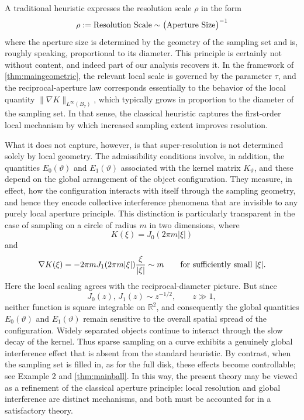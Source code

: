 \documentclass[11pt]{article}
\theoremstyle{definition}
\numberwithin{theorem}{section}
\numberwithin{lemma}{section}
\numberwithin{equation}{section}
\def\R{\mathbb{R}}
\numberwithin{equation}{section}
\begin{document}
A traditional heuristic expresses the resolution scale $\rho$ in the form
\begin{equation}
\label{eq:folklore}
\rho := \hbox{Resolution Scale} \sim \big(\hbox{Aperture Size}\big)^{-1}
\end{equation}
where the aperture size is determined by the geometry of the sampling set and is, roughly speaking, proportional to its diameter. 
This principle is certainly not without content, and indeed part of our analysis recovers it. In the framework of \cref{thm:maingeometric}, the relevant local scale is governed by the parameter $\tau$, and the reciprocal-aperture law corresponds essentially to the behavior of the local quantity $\|\nabla K\|_{L^\infty(B_\tau)}$, which typically grows in proportion to the diameter of the sampling set. In that sense, the classical heuristic captures the first-order local mechanism by which increased sampling extent improves resolution.

What it does not capture, however, is that super-resolution is not determined solely by local geometry. The admissibility conditions involve, in addition, the quantities $E_0(\vartheta)$ and $E_1(\vartheta)$ associated with the kernel matrix $K_\vartheta$, and these depend on the global arrangement of the object configuration. They measure, in effect, how the configuration interacts with itself through the sampling geometry, and hence they encode collective interference phenomena that are invisible to any purely local aperture principle. This distinction is particularly transparent in the case of sampling on a circle of radius $m$ in two dimensions, where
\[
K(\xi)=J_0(2\pi m|\xi|)
\]
and
\[
\nabla K(\xi)=-2\pi m J_1(2\pi m|\xi|)\frac{\xi}{|\xi|}
\sim m
\qquad \hbox{for sufficiently small } |\xi|.
\]
Here the local scaling agrees with the reciprocal-diameter picture. But since
\[
J_0(z),\,J_1(z)\sim z^{-1/2}, \qquad z\gg 1,
\]
neither function is square integrable on $\R^2$, and consequently the global quantities $E_0(\vartheta)$ and $E_1(\vartheta)$ remain sensitive to the overall spatial spread of the configuration. Widely separated objects continue to interact through the slow decay of the kernel. Thus sparse sampling on a curve exhibits a genuinely global interference effect that is absent from the standard heuristic. By contrast, when the sampling set is filled in, as for the full disk, these effects become controllable; see Example 2 and \cref{thm:mainball}. In this way, the present theory may be viewed as a refinement of the classical aperture principle: local resolution and global interference are distinct mechanisms, and both must be accounted for in a satisfactory theory.
\end{document}
